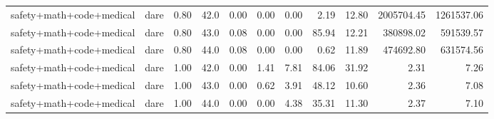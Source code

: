 \documentclass{article}
\begin{document}
\begin{table}[H]
{\begin{tabular}{llllrrrrrrr}
safety+math+code+medical & dare & 0.80 & 42.0 & 0.00 & 0.00 & 0.00 & 2.19 & 12.80 & 2005704.45 & 1261537.06 \\
safety+math+code+medical & dare & 0.80 & 43.0 & 0.08 & 0.00 & 0.00 & 85.94 & 12.21 & 380898.02 & 591539.57 \\
safety+math+code+medical & dare & 0.80 & 44.0 & 0.08 & 0.00 & 0.00 & 0.62 & 11.89 & 474692.80 & 631574.56 \\
safety+math+code+medical & dare & 1.00 & 42.0 & 0.00 & 1.41 & 7.81 & 84.06 & 31.92 & 2.31 & 7.26 \\
safety+math+code+medical & dare & 1.00 & 43.0 & 0.00 & 0.62 & 3.91 & 48.12 & 10.60 & 2.36 & 7.08 \\
safety+math+code+medical & dare & 1.00 & 44.0 & 0.00 & 0.00 & 4.38 & 35.31 & 11.30 & 2.37 & 7.10 \\
\bottomrule
\end{tabular}
}
\end{table}
\end{document}

